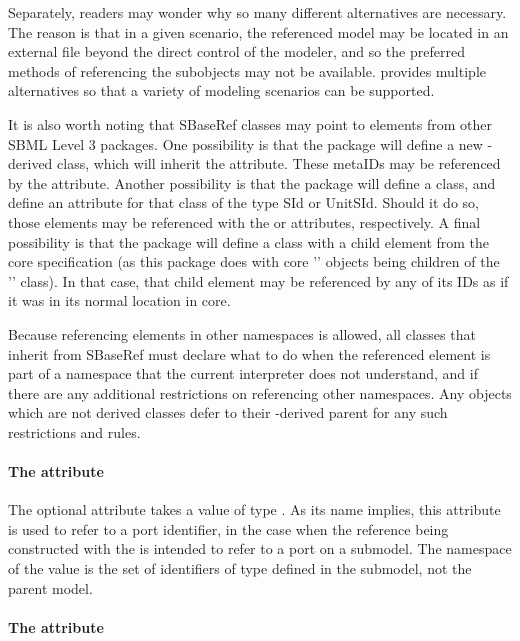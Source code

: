 Separately, readers may wonder why so many different alternatives are
necessary.  The reason is that in a given scenario, the referenced model
may be located in an external file beyond the direct control of the
modeler, and so the preferred methods of referencing the subobjects may
not be available.  \SBaseRef provides multiple alternatives so that a
variety of modeling scenarios can be supported.

It is also worth noting that SBaseRef classes may point to elements
from other SBML Level 3 packages.  One possibility is that the package
will define a new \SBase-derived class, which will inherit the 
attribute.  These metaIDs may be referenced by the \SBaseRef {}
attribute.  Another possibility is that the package will define a class,
and define an attribute for that class of the type SId or UnitSId.  Should
it do so, those elements may be referenced with the  or 
attributes, respectively.  A final possibility is that the package will 
define a class with a child element from the core specification (as this 
package does with core '\Model' objects being children of the 
'\listOfModelDefinitions' class).  In that case, that child element may be 
referenced by any of its IDs as if it was in its normal location in core.

Because referencing elements in other namespaces is allowed, all classes that
inherit from SBaseRef must declare what to do when the referenced element
is part of a namespace that the current interpreter does not understand, and
if there are any additional restrictions on referencing other namespaces.  Any
\SBaseRef objects which are not derived classes defer to their \SBaseRef-derived
parent for any such restrictions and rules.

\paragraph{The \fixttspace{} attribute}
\label{sbaseref-portref}

The optional attribute  takes a value of type
.  As its name implies, this attribute is used to
refer to a port identifier, in the case when the reference being
constructed with the \SBaseRef is intended to refer to a port on a
submodel.  The namespace of the  value is the set
of identifiers of type  defined in the submodel, not
the parent model.


\paragraph{The \fixttspace{} attribute}
\label{sbaseref-idref}


